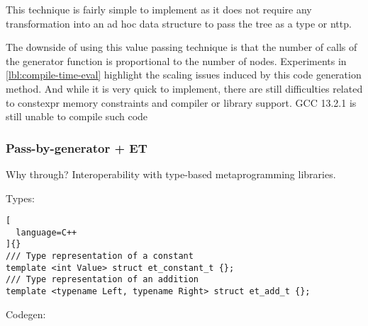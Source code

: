 \documentclass[../main]{subfiles}
\begin{document}
This technique is fairly simple to implement as it does not require any
transformation into an ad hoc data structure to pass the tree as a type
or \gls{nttp}.

The downside of using this value passing technique is that the
number of calls of the generator function is proportional to the
number of nodes. Experiments in \ref{lbl:compile-time-eval} highlight
the scaling issues induced by this code generation method.
And while it is very quick to implement, there are still difficulties
related to \gls{constexpr} memory constraints and compiler or library support.
GCC 13.2.1 is still unable to compile such code


\subsubsection{
  Pass-by-generator + ET
}

\label{lbl:pbg-et-technique}

Why through? Interoperability with type-based metaprogramming libraries.

Types:

\begin{lstlisting}[
  language=C++
]{}
/// Type representation of a constant
template <int Value> struct et_constant_t {};
/// Type representation of an addition
template <typename Left, typename Right> struct et_add_t {};
\end{lstlisting}

Codegen:
\end{document}
